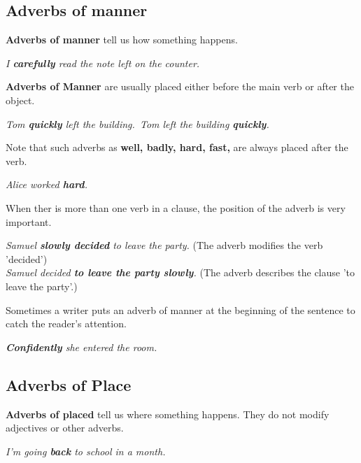 \documentclass[hidelinks,10pt,a4paper]{article}
\begin{document}
\subsection{Adverbs of manner}
\textbf{Adverbs of manner} tell us how something happens.

\begin{center}
	\textit{I \textbf{carefully} read the note left on the counter.}
\end{center}

\textbf{Adverbs of Manner} are usually placed either before the main verb or after the object.

\begin{center}
	\textit{Tom \textbf{quickly} left the building.\
	Tom left the building \textbf{quickly}. }
\end{center}

Note that such adverbs as \textbf{well, badly, hard, fast,} are always placed after the verb.

\begin{center}
	\textit{  Alice worked \textbf{hard}.}
\end{center}
When ther is more than one verb in a clause, the position of the adverb is very important.

\begin{center}
	\textit{Samuel \textbf{slowly decided} to leave the party.} (The adverb modifies the verb 'decided')\\
	\textit{Samuel decided \textbf{to leave the party slowly}.} (The adverb describes the clause 'to leave the party'.)
\end{center}

Sometimes a writer puts an adverb of manner at the beginning of the sentence to catch the reader's attention.

\begin{center}
	\textit{\textbf{Confidently} she entered the room.}
\end{center}

\subsection{Adverbs of Place}
\textbf{Adverbs of placed} tell us where something happens. They do not modify adjectives or other adverbs.

\begin{center}
	\textit{I'm going \textbf{back} to school in a month.}
\end{center}
\end{document}
